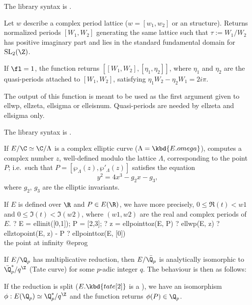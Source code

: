 The library syntax is .

\label{se:ellperiods}
Let $w$ describe a complex period lattice ($w = [w_1,w_2]$
or an  structure). Returns normalized periods $[W_1,W_2]$ generating
the same lattice such that $\tau := W_1/W_2$ has positive imaginary part
and lies in the standard fundamental domain for $\text{SL}_2(\Z)$.

If $\fl = 1$, the function returns $[[W_1,W_2], [\eta_1,\eta_2]]$, where
$\eta_1$ and $\eta_2$ are the quasi-periods attached to
$[W_1,W_2]$, satisfying $\eta_1 W_2 - \eta_2 W_1 = 2 i \pi$.

The output of this function is meant to be used as the first argument
given to ellwp, ellzeta, ellsigma or elleisnum. Quasi-periods are
needed by ellzeta and ellsigma only.

The library syntax is .

\label{se:ellpointtoz}
If $E/\C \simeq \C/\Lambda$ is a complex elliptic curve ($\Lambda =
\kbd{E.omega}$),
computes a complex number $z$, well-defined modulo the lattice $\Lambda$,
corresponding to the point $P$; i.e.~such that
 $P = [\wp_\Lambda(z),\wp'_\Lambda(z)]$
satisfies the equation
$$y^2 = 4x^3 - g_2 x - g_3,$$
where $g_2$, $g_3$ are the elliptic invariants.

If $E$ is defined over $\R$ and $P\in E(\R)$, we have more precisely, $0 \leq
\Re(t) < w1$ and $0 \leq \Im(t) < \Im(w2)$, where $(w1,w2)$ are the real and
complex periods of $E$.
\bprog
? E = ellinit([0,1]); P = [2,3];
? z = ellpointtoz(E, P)
? ellwp(E, z)
? ellztopoint(E, z) - P
? ellpointtoz(E, [0]) \\ the point at infinity
@eprog

If $E/\Q_p$ has multiplicative reduction, then $E/\bar{\Q_p}$ is analytically
isomorphic to $\bar{\Q}_p^*/q^\Z$ (Tate curve) for some $p$-adic integer $q$.
The behaviour is then as follows:

\item If the reduction is split ($E.\kbd{tate[2]}$ is a ), we have
an isomorphism $\phi: E(\Q_p) \simeq \Q_p^*/q^\Z$ and the function returns
$\phi(P)\in \Q_p$.

